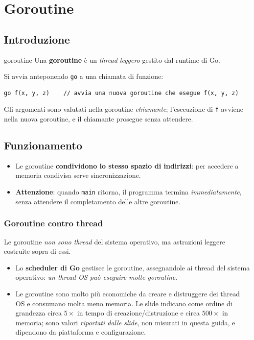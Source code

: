 \documentclass[11pt,a4paper]{report}
\newcommand{\cod}[1]{\texttt{#1}}
\begin{document}
\section{Goroutine}\label{sec:goroutine}

\subsection{Introduzione}

\begin{definizione}{goroutine}
Una \textbf{goroutine} è un \emph{thread leggero} gestito dal runtime di Go.
\end{definizione}

Si avvia anteponendo \cod{go} a una chiamata di funzione:

\begin{lstlisting}[style=gocode,numbers=none]
go f(x, y, z)    // avvia una nuova goroutine che esegue f(x, y, z)
\end{lstlisting}

Gli argomenti sono valutati nella goroutine \emph{chiamante}; l'esecuzione di
\cod{f} avviene nella nuova goroutine, e il chiamante prosegue senza attendere.

\subsection{Funzionamento}

\begin{itemize}
  \item Le goroutine \textbf{condividono lo stesso spazio di indirizzi}: per
        accedere a memoria condivisa serve sincronizzazione.
  \item \textbf{Attenzione}: quando \cod{main} ritorna, il programma termina
        \emph{immediatamente}, senza attendere il completamento delle altre
        goroutine.
\end{itemize}

\subsubsection{Goroutine contro thread}

Le goroutine \emph{non sono thread} del sistema operativo, ma astrazioni
leggere costruite sopra di essi.

\begin{itemize}
  \item Lo \textbf{scheduler di Go} gestisce le goroutine, assegnandole ai
        thread del sistema operativo: \emph{un thread OS può eseguire molte
        goroutine}.
  \item Le goroutine sono molto più economiche da creare e distruggere dei
        thread OS e consumano molta meno memoria. Le slide indicano come ordine
        di grandezza circa $5\times$ in tempo di creazione/distruzione e circa
        $500\times$ in memoria; sono valori \emph{riportati dalle slide}, non
        misurati in questa guida, e dipendono da piattaforma e configurazione.
\end{itemize}
\end{document}
